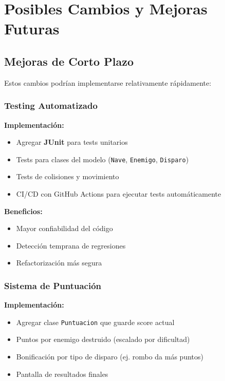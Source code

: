 \documentclass[12pt, a4paper]{article}
\begin{document}
\section{Posibles Cambios y Mejoras Futuras}

\subsection{Mejoras de Corto Plazo}

Estos cambios podrían implementarse relativamente rápidamente:

\subsubsection{Testing Automatizado}

\textbf{Implementación:}
\begin{itemize}[leftmargin=2em]
    \item Agregar \textbf{JUnit} para tests unitarios
    \item Tests para clases del modelo (\texttt{Nave}, \texttt{Enemigo}, \texttt{Disparo})
    \item Tests de colisiones y movimiento
    \item CI/CD con GitHub Actions para ejecutar tests automáticamente
\end{itemize}

\textbf{Beneficios:}
\begin{itemize}[leftmargin=2em]
    \item Mayor confiabilidad del código
    \item Detección temprana de regresiones
    \item Refactorización más segura
\end{itemize}

\subsubsection{Sistema de Puntuación}

\textbf{Implementación:}
\begin{itemize}[leftmargin=2em]
    \item Agregar clase \texttt{Puntuacion} que guarde score actual
    \item Puntos por enemigo destruido (escalado por dificultad)
    \item Bonificación por tipo de disparo (ej. rombo da más puntos)
    \item Pantalla de resultados finales
\end{itemize}
\end{document}
